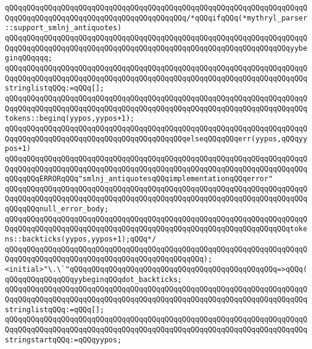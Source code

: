 \verb|qQQqqQQqqQQqqQQqqQQqqQQqqQQqqQQqqQQqqQQqqQQqqQQqqQQqqQQqqQQqqQQqqQQqqQQqqQQqqQQqqQQqqQQqqQQqqQQqqQQqqQQqqQQqqQQq/*qQQqifqQQq(*mythryl_parser::support_smlnj_antiquotes)|\newline
\verb|qQQqqQQqqQQqqQQqqQQqqQQqqQQqqQQqqQQqqQQqqQQqqQQqqQQqqQQqqQQqqQQqqQQqqQQqqQQqqQQqqQQqqQQqqQQqqQQqqQQqqQQqqQQqqQQqqQQqqQQqqQQqqQQqqQQqqQQqyybeginqQQqqqq;|\newline
\verb|qQQqqQQqqQQqqQQqqQQqqQQqqQQqqQQqqQQqqQQqqQQqqQQqqQQqqQQqqQQqqQQqqQQqqQQqqQQqqQQqqQQqqQQqqQQqqQQqqQQqqQQqqQQqqQQqqQQqqQQqqQQqqQQqqQQqqQQqqQQqstringlistqQQq:=qQQq[];|\newline
\verb|qQQqqQQqqQQqqQQqqQQqqQQqqQQqqQQqqQQqqQQqqQQqqQQqqQQqqQQqqQQqqQQqqQQqqQQqqQQqqQQqqQQqqQQqqQQqqQQqqQQqqQQqqQQqqQQqqQQqqQQqqQQqqQQqqQQqqQQqqQQqtokens::beginq(yypos,yypos+1);|\newline
\verb|qQQqqQQqqQQqqQQqqQQqqQQqqQQqqQQqqQQqqQQqqQQqqQQqqQQqqQQqqQQqqQQqqQQqqQQqqQQqqQQqqQQqqQQqqQQqqQQqqQQqqQQqqQQqqQQqelseqQQqqQQqerr(yypos,qQQqyypos+1)|\newline
\verb|qQQqqQQqqQQqqQQqqQQqqQQqqQQqqQQqqQQqqQQqqQQqqQQqqQQqqQQqqQQqqQQqqQQqqQQqqQQqqQQqqQQqqQQqqQQqqQQqqQQqqQQqqQQqqQQqqQQqqQQqqQQqqQQqqQQqqQQqqQQqqQQqqQQqERRORqQQq"smlnj_antiquotesqQQqimplementationqQQqerror"|\newline
\verb|qQQqqQQqqQQqqQQqqQQqqQQqqQQqqQQqqQQqqQQqqQQqqQQqqQQqqQQqqQQqqQQqqQQqqQQqqQQqqQQqqQQqqQQqqQQqqQQqqQQqqQQqqQQqqQQqqQQqqQQqqQQqqQQqqQQqqQQqqQQqqQQqqQQqnull_error_body;|\newline
\verb|qQQqqQQqqQQqqQQqqQQqqQQqqQQqqQQqqQQqqQQqqQQqqQQqqQQqqQQqqQQqqQQqqQQqqQQqqQQqqQQqqQQqqQQqqQQqqQQqqQQqqQQqqQQqqQQqqQQqqQQqqQQqqQQqqQQqqQQqtokens::backticks(yypos,yypos+1);qQQq*/|\newline
\verb|qQQqqQQqqQQqqQQqqQQqqQQqqQQqqQQqqQQqqQQqqQQqqQQqqQQqqQQqqQQqqQQqqQQqqQQqqQQqqQQqqQQqqQQqqQQqqQQqqQQqqQQqqQQqqQQqqQQq);|\newline
\newline
\verb|<initial>"\.\`"qQQqqQQqqQQqqQQqqQQqqQQqqQQqqQQqqQQqqQQqqQQqqQQq=>qQQq(qQQqqQQqqQQqqQQqyybeginqQQqdot_backticks;|\newline
\verb|qQQqqQQqqQQqqQQqqQQqqQQqqQQqqQQqqQQqqQQqqQQqqQQqqQQqqQQqqQQqqQQqqQQqqQQqqQQqqQQqqQQqqQQqqQQqqQQqqQQqqQQqqQQqqQQqqQQqqQQqqQQqqQQqqQQqqQQqqQQqstringlistqQQq:=qQQq[];|\newline
\verb|qQQqqQQqqQQqqQQqqQQqqQQqqQQqqQQqqQQqqQQqqQQqqQQqqQQqqQQqqQQqqQQqqQQqqQQqqQQqqQQqqQQqqQQqqQQqqQQqqQQqqQQqqQQqqQQqqQQqqQQqqQQqqQQqqQQqqQQqqQQqstringstartqQQq:=qQQqyypos;|\newline
